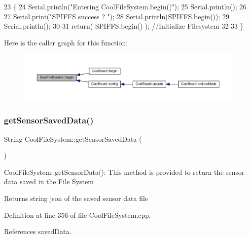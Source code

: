 \begin{DoxyCode}
23 \{
24     Serial.println(\textcolor{stringliteral}{"Entering CoolFileSystem.begin()"});
25     Serial.println();
26     
27     Serial.print(\textcolor{stringliteral}{"SPIFFS success ? "});
28     Serial.println(SPIFFS.begin());
29     Serial.println();
30     
31     \textcolor{keywordflow}{return}( SPIFFS.begin() );                                   \textcolor{comment}{//Initialize Filesystem}
32 
33 \}
\end{DoxyCode}
Here is the caller graph for this function\+:\nopagebreak
\begin{figure}[H]
\begin{center}
\leavevmode
\includegraphics[width=350pt]{classCoolFileSystem_a6ba6f666ed4c530174f8569d2c636748_icgraph}
\end{center}
\end{figure}
\mbox{\label{classCoolFileSystem_a5c58bca3735c0ed3efb268d70ef998ef}} 
\subsubsection{\texorpdfstring{get\+Sensor\+Saved\+Data()}{getSensorSavedData()}}
{\footnotesize\ttfamily String Cool\+File\+System\+::get\+Sensor\+Saved\+Data (\begin{DoxyParamCaption}{ }\end{DoxyParamCaption})}

Cool\+File\+System\+::get\+Sensor\+Data()\+: This method is provided to return the sensor data saved in the File System

\begin{DoxyReturn}{Returns}
string json of the saved sensor data file 
\end{DoxyReturn}


Definition at line 356 of file Cool\+File\+System.\+cpp.



References saved\+Data.



